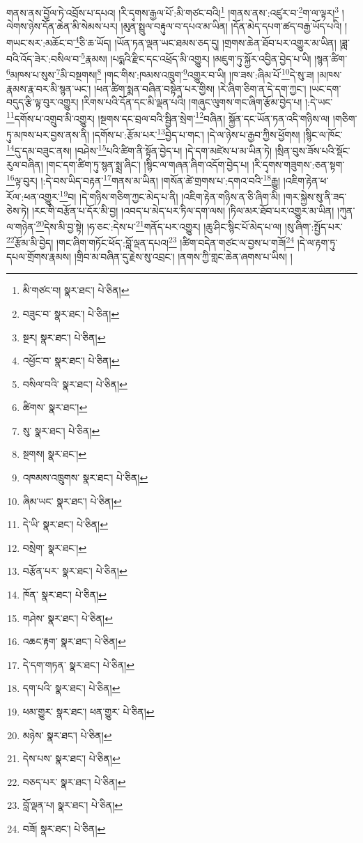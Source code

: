 གནས་ནས་བྱོལ་ཏེ་འབྲོས་པ་དཔའ། །རི་དྭགས་རྒྱལ་པོ་:མི་གཙང་བའི།\footnote{མི་གཙང་བ།  སྣར་ཐང་།  པེ་ཅིན། } །གནས་ནས་:འཛུར་བ་\footnote{བཟུང་བ་  སྣར་ཐང་།  པེ་ཅིན། }ག་ལ་ལྟར།\footnote{སྔར།  སྣར་ཐང་།  པེ་ཅིན། } །ལེགས་ཉེས་དོན་ཆེན་མི་སེམས་པར། །མུན་སྤྲུལ་བརྟུལ་བ་དཔའ་མ་ཡིན། །དོན་མེད་དཔག་ཚད་བརྒྱ་ཡོད་པའི། །གཡང་སར་:མཆོང་བ་\footnote{འཕྱོང་བ་  སྣར་ཐང་།  པེ་ཅིན། }ཅི་ཆ་ཡོད། །ཡོན་ཏན་ལྡན་ཡང་ཐམས་ཅད་དུ། །གྲགས་ཆེན་ཐོབ་པར་འགྱུར་མ་ཡིན། །ཟླ་བའི་འོད་ཟེར་:བསིལ་བ་\footnote{བསིལ་བའི་  སྣར་ཐང་།  པེ་ཅིན། }རྣམས། །པདྨའི་རྫིང་དང་འཕྲོད་མི་འགྱུར། །མཇུག་ཏུ་སྐྱོར་འབྱིན་བྱེད་པ་ཡི། །སྙན་ཚིག་\footnote{ཚིགས་  སྣར་ཐང་། }མཁས་པ་སུས་\footnote{སུ་  སྣར་ཐང་།  པེ་ཅིན། }མི་བསྔགས།\footnote{སྔགས།  སྣར་ཐང་། } །གང་གིས་:ཁམས་འཁྲུག་\footnote{འཁམས་འཁྲུགས་  སྣར་ཐང་།  པེ་ཅིན། }འགྱུར་བ་ཡི། །ཁ་ཟས་:ཞིམ་པོ་\footnote{ཞིམ་ཡང་  སྣར་ཐང་།  པེ་ཅིན། }དེ་སུ་ཟ། །མཁས་རྣམས་རྣ་བར་མི་སྙན་ཡང་། །ཕན་ཚིག་སྨན་བཞིན་བསྟེན་པར་གྱིས། །རེ་ཞིག་ཅིག་ན་དེ་དག་ཀྱང་། །ཡང་དག་བདུད་རྩི་ལྟ་བུར་འགྱུར། །རིགས་པའི་དོན་དང་མི་ལྡན་པའི། །གཞུང་ལུགས་གང་ཞིག་རྩོམ་བྱེད་པ། །:དེ་ཡང་\footnote{དེ་ཡི་  སྣར་ཐང་།  པེ་ཅིན། }དགོས་པ་འགྲུབ་མི་འགྱུར། །སྔགས་དང་བྲལ་བའི་སྦྱིན་སྲེག་\footnote{བསྲེག་  སྣར་ཐང་། }བཞིན། སྐྱོན་དང་ཡོན་ཏན་འདི་གཉིས་ལ། །གཅིག་ཏུ་མཁས་པར་བྱས་ནས་ནི། །དགོས་པ་:རྩོམ་པར་\footnote{བརྩོན་པར་  སྣར་ཐང་།  པེ་ཅིན། }བྱེད་པ་གང་། །དེ་ལ་ཉེས་པ་རྒྱབ་ཀྱིས་ཕྱོགས། །སྙིང་ལ་ཁོང་\footnote{ཁོན་  སྣར་ཐང་།  པེ་ཅིན། }དུ་དམ་བཟུང་ནས། །བཤེས་\footnote{གཤེས་  སྣར་ཐང་།  པེ་ཅིན། }པའི་ཚིག་ནི་སྟོན་བྱེད་པ། །དེ་དག་མཛེས་པ་མ་ཡིན་ཏེ། །སྲིན་བུས་ཟོས་པའི་སྡོང་རུལ་བཞིན། །གང་དག་ཚིག་ཏུ་སྙན་སྨྲ་ཞིང་། །སྙིང་ལ་གཞན་ཞིག་འདོག་བྱེད་པ། །རི་དྭགས་གཟུགས་:ཅན་སྟག་\footnote{འཆང་རྟག་  སྣར་ཐང་།  པེ་ཅིན། }ལྟ་བུར། །:དེ་བས་ཡིད་བརྟན་\footnote{དེ་དག་གཏན་  སྣར་ཐང་།  པེ་ཅིན། }གནས་མ་ཡིན། །གསོན་ཚེ་གྲགས་པ་:དགའ་བའི་\footnote{དག་པའི་  སྣར་ཐང་།  པེ་ཅིན། }རྒྱུ། །འཇིག་རྟེན་ཕ་རོལ་:ཕན་འགྱུར་\footnote{ཕམ་གྱུར་  སྣར་ཐང་། ཕན་གྱུར་  པེ་ཅིན། }བ། །དེ་གཉིས་གཅིག་ཀྱང་མེད་པ་ནི། །འཇིག་རྟེན་གཉིས་ན་ཅི་ཞིག་མི། །གར་སྐྱེས་སུ་ནི་ཟད་ཅེས་ཏེ། །རང་གི་བརྩོན་པ་དོར་མི་བྱ། །འབད་པ་མེད་པར་ཏིལ་དག་ལས། །ཏིལ་མར་ཐོབ་པར་འགྱུར་མ་ཡིན། །ཀུན་ལ་གཉེན་\footnote{མཉེས་  སྣར་ཐང་།  པེ་ཅིན། }དེས་མི་བྱ་སྟེ། །ཧ་ཅང་:དེས་པ་\footnote{དེས་པས་  སྣར་ཐང་།  པེ་ཅིན། }གནོད་པར་འགྱུར། །ཆུ་ཤིང་སྙིང་པོ་མེད་པ་ལ། །སུ་ཞིག་:སྤྱོད་པར་\footnote{བཅད་པར་  སྣར་ཐང་།  པེ་ཅིན། }རྩོམ་མི་བྱེད། །གང་ཞིག་གཏོང་ཕོད་:བློ་ལྡན་དཔའ།\footnote{བློ་ལྡན་པ།  སྣར་ཐང་།  པེ་ཅིན། } །ཚིག་བདེན་གཙང་ལ་བྱས་པ་གཟོ།\footnote{བཟོ།  སྣར་ཐང་།  པེ་ཅིན། } །དེ་ལ་རྟག་ཏུ་དཔལ་གྲོགས་རྣམས། །གྲིབ་མ་བཞིན་དུ་རྗེས་སུ་འབྲང་། །ནགས་ཀྱི་གླང་ཆེན་ཞགས་པ་ཡིས། །
